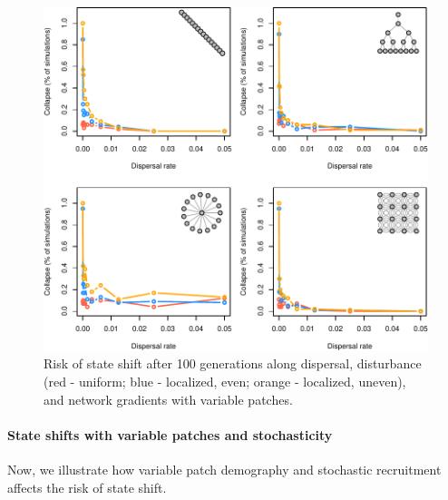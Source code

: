 \documentclass[
]{article}
\begin{document}
\begin{figure}[H]

{\centering \includegraphics{Managing_for_ecological_surprises_in_metapopulations_files/figure-latex/collapsed with variable patches-1} 

}

\caption{Risk of state shift after 100 generations along dispersal, disturbance (red - uniform; blue - localized, even; orange - localized, uneven), and network gradients with variable patches.}\label{fig:collapsed with variable patches}
\end{figure}
\newpage

\hypertarget{state-shifts-with-variable-patches-and-stochasticity}{%
\paragraph{State shifts with variable patches and
stochasticity}\label{state-shifts-with-variable-patches-and-stochasticity}}

Now, we illustrate how variable patch demography and stochastic
recruitment affects the risk of state shift.
\end{document}
